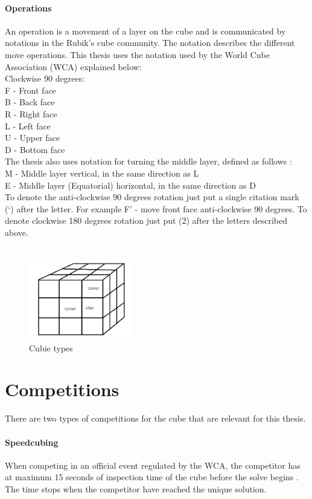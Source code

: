 \documentclass[a4paper,11pt]{kth-mag}
\begin{document}
\paragraph{Operations}
An operation is a movement of a layer on the cube and is communicated by notations in the Rubik's cube community. The notation describes the different move operations. This thesis uses the notation used by the World Cube Association (WCA) \cite{WCA1} explained below:\\
Clockwise 90 degrees:\\
F - Front face\\
B - Back face\\
R - Right face\\
L - Left face\\
U - Upper face\\
D - Bottom face\\
The thesis also uses notation for turning the middle layer, defined as follows \cite{Ruwix}:\\
M - Middle layer vertical, in the same direction as L\\
E - Middle layer (Equatorial) horizontal, in the same direction as D\\
To denote the anti-clockwise 90 degrees rotation just put a single citation mark (‘) after the letter. For example F’ - move front face anti-clockwise 90 degrees.
To denote clockwise 180 degrees rotation just put (2) after the letters described above.\\\\


\begin{figure}[t]
	\centering
	\includegraphics[width= 0.4\textwidth]{figs/representation.png}
	\caption{Cubie types}
	\label{fig_3}
\end{figure}
\section{Competitions}
There are two types of competitions for the cube that are relevant for this thesis.
\paragraph{Speedcubing}
When competing in an official event regulated by the WCA, the competitor has at maximum 15 seconds of inspection time of the cube before the solve begins \cite{WCA2}. The time stops when the competitor have reached the unique solution. 
\end{document}
